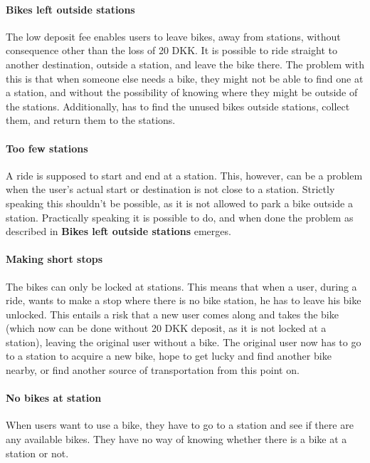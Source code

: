 \paragraph{Bikes left outside stations}
The low deposit fee enables users to leave bikes, away from stations, without consequence other than the loss of 20 DKK.
It is possible to ride straight to another destination, outside a station, and leave the bike there.
The problem with this is that when someone else needs a bike, they might not be able to find one at a station, and without the possibility of knowing where they might be outside of the stations.
Additionally, \citybike has to find the unused bikes outside stations, collect them, and return them to the stations.

\paragraph{Too few stations}
A ride is supposed to start and end at a station.
This, however, can be a problem when the user's actual start or destination is not close to a station.
Strictly speaking this shouldn't be possible, as it is not allowed to park a bike outside a station.
Practically speaking it is possible to do, and when done the problem as described in \textbf{Bikes left outside stations} emerges.

\paragraph{Making short stops}
The bikes can only be locked at stations.
This means that when a user, during a ride, wants to make a stop where there is no bike station, he has to leave his bike unlocked.
This entails a risk that a new user comes along and takes the bike (which now can be done without 20 DKK deposit, as it is not locked at a station), leaving the original user without a bike.
The original user now has to go to a station to acquire a new bike, hope to get lucky and find another bike nearby, or find another source of transportation from this point on.

\paragraph{No bikes at station}
When users want to use a bike, they have to go to a station and see if there are any available bikes.
They have no way of knowing whether there is a bike at a station or not.

